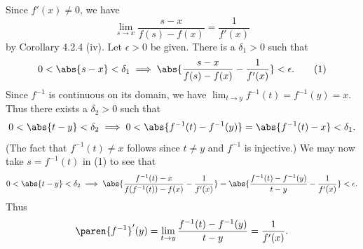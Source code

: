 \documentclass{lew98_solutions}
\begin{document}
\begin{solution}
    Since \( f'(x) \neq 0 \), we have
    \[
        \lim_{s \to x} \frac{s - x}{f(s) - f(x)} = \frac{1}{f'(x)}
    \]
    by Corollary 4.2.4 (iv). Let \( \epsilon > 0 \) be given. There is a \( \delta_1 > 0 \) such that
    \[
        0 < \abs{s - x} < \delta_1 \implies \abs{\frac{s - x}{f(s) - f(x)} - \frac{1}{f'(x)}} < \epsilon. \tag{1}
    \]
    Since \( f^{-1} \) is continuous on its domain, we have \( \lim_{t \to y} f^{-1}(t) = f^{-1}(y) = x \). Thus there exists a \( \delta_2 > 0 \) such that
    \[
        0 < \abs{t - y} < \delta_2 \implies 0 < \abs{f^{-1}(t) - f^{-1}(y)} = \abs{f^{-1}(t) - x} < \delta_1.
    \]
    (The fact that \( f^{-1}(t) \neq x \) follows since \( t \neq y \) and \( f^{-1} \) is injective.) We may now take \( s = f^{-1}(t) \) in (1) to see that
    \[
        0 < \abs{t - y} < \delta_2 \implies \abs{\frac{f^{-1}(t) - x}{f(f^{-1}(t)) - f(x)} - \frac{1}{f'(x)}} = \abs{\frac{f^{-1}(t) - f^{-1}(y)}{t - y} - \frac{1}{f'(x)}} < \epsilon.
    \]
    Thus
    \[
        \paren{f^{-1}}'(y) = \lim_{t \to y} \frac{f^{-1}(t) - f^{-1}(y)}{t - y} = \frac{1}{f'(x)}.
    \]
\end{solution}
\end{document}
